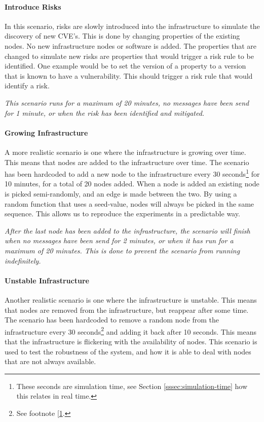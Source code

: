 \paragraph{Introduce Risks} 
In this scenario, risks are slowly introduced into the infrastructure to simulate the discovery of new CVE's. This is done by changing properties of the existing nodes. No new infrastructure nodes or software is added. The properties that are changed to simulate new risks are properties that would trigger a risk rule to be identified. One example would be to set the  version of a property to a version that is known to have a vulnerability. This should trigger a risk rule that would identify a risk.

\textit{This scenario runs for a maximum of 20 minutes, no messages have been send for 1 minute, or when the risk has been identified and mitigated.}

\paragraph*{Growing Infrastructure}
A more realistic scenario is one where the infrastructure is growing over time. This means that nodes are added to the infrastructure over time. The scenario has been hardcoded to add a new node to the infrastructure every 30 seconds\footnote{\label{footnote:simulation-time}These seconds are simulation time, see Section \ref{sssec:simulation-time} how this relates in real time.} for 10 minutes, for a total of 20 nodes added. When a node is added an existing node is picked semi-randomly, and an edge is made between the two. By using a random function that uses a seed-value, nodes will always be picked in the same sequence. This allows us to reproduce the experiments in a predictable way.

\textit{After the last node has been added to the infrastructure, the scenario will finish when no messages have been send for 2 minutes, or when it has run for a maximum of 20 minutes. This is done to prevent the scenario from running indefinitely.}

\paragraph*{Unstable Infrastructure}
Another realistic scenario is one where the infrastructure is unstable. This means that nodes are removed from the infrastructure, but reappear after some time. The scenario has been hardcoded to remove a random node from the infrastructure every 30 seconds\footnote{See footnote [\ref{footnote:simulation-time}.} and adding it back after 10 seconds. This means that the infrastructure is flickering with the availability of nodes. This scenario is used to test the robustness of the system, and how it is able to deal with nodes that are not always available.

